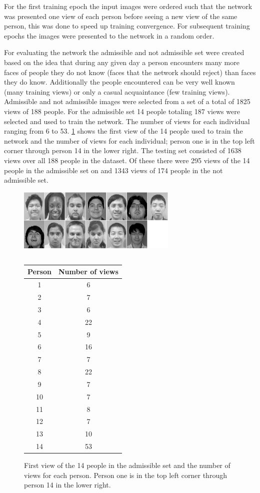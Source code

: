 \documentclass[conference]{IEEEtran}
\begin{document}
For the first training epoch the input images were ordered such that the network was presented one view of each person before seeing a new view of the same person, this was done to speed up training convergence.  For subsequent training epochs the images were presented to the network in a random order.

For evaluating the network the admissible and not admissible set were created based on the idea that during any given day a person encounters many more faces of people they do not know (faces that the network should reject) than faces they do know.  Additionally the people encountered can be very well known (many training views) or only a casual acquaintance (few training views).  Admissible and not admissible images were selected from a set of a total of 1825 views of 188 people.  For the admissible set 14 people totaling 187 views were selected and used to train the network. The number of views for each individual ranging from 6 to 53. \ref{fig:training} shows the first view of the 14 people used to train the network and the number of views for each individual; person one is in the top left corner through person 14 in the lower right. The testing set consisted of 1638 views over all 188 people in the dataset.  Of these there were 295 views of the 14 people in the admissible set on and 1343 views of 174 people in the not admissible set.  

\begin{figure}
\center
\fontsize{8}{12}\selectfont
\includegraphics[width=3in]{figs/training_faces}
\begin{tabular}{c} \\[3ex] \end{tabular}
\begin{tabular}{|c|c|}
  \hline
  Person & Number of views\\
  \hline
  1 & 6\\
  2 & 7\\
  3 & 6\\
  4 & 22\\
  5 & 9\\
  6 & 16\\
  7 & 7\\
  8 & 22\\
  9 & 7\\
  10 & 7\\
  11 & 8\\
  12 & 7\\
  13 & 10\\
  14 & 53\\
  \hline
\end{tabular}
\caption{First view of the 14 people in the admissible set and the number of views for each person.  Person one is in the top left corner through person 14 in the lower right.}
\label{fig:training}
\end{figure}
\end{document}
